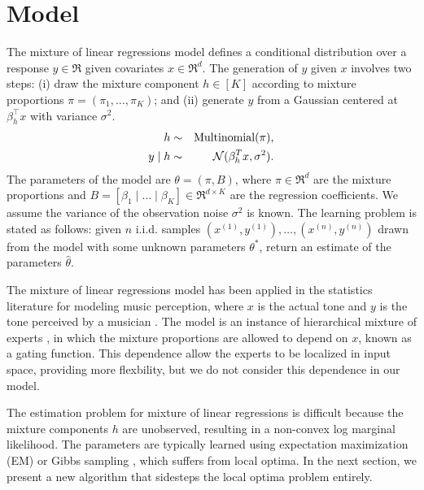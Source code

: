 \section{Model}
\label{sec:model}

\newcommand{\xn}[1]{x^{(#1)}}
\newcommand{\xni}{\xn{i}}
\newcommand{\yn}[1]{y^{(#1)}}
\newcommand{\yni}{\yn{i}}

The mixture of linear regressions model \citep{VieleTong2002} defines
a conditional distribution over a response $y \in \Re$
given covariates $x \in \Re^d$.
The generation of $y$ given $x$ involves two steps:
(i) draw the mixture component $h \in [K]$ according to mixture proportions
$\pi = (\pi_1, \dots, \pi_K)$;
and (ii) generate $y$ from a Gaussian centered at $\beta_h^\top x$ with
variance $\sigma^2$.
\begin{eqnarray*}
  h &\sim& \operatorname{Multinomial}(\pi), \\
  y \mid h &\sim& \mathcal{N}( \beta_{h}^T x,  \sigma^2 ).
\end{eqnarray*}
The parameters of the model are $\theta = (\pi, B)$,
where $\pi \in \Re^d$ are the mixture proportions and
$B = [\beta_1 \mid \dots \mid \beta_K] \in \Re^{d \times K}$
are the regression coefficients.
We assume the variance of the observation noise $\sigma^2$ is known.
The learning problem is stated as follows:
given $n$ i.i.d. samples $(\xn{1}, \yn{1}), \dots, (\xn{n}, \yn{n})$
drawn from the model with some unknown parameters $\theta^*$,
return an estimate of the parameters $\hat\theta$.

The mixture of linear regressions model has been applied
in the statistics literature for modeling music perception, where $x$ is the
actual tone and $y$ is the tone perceived by a musician \cite{VieleTong2002}.
The model is an instance of hierarchical mixture of experts
\cite{jacobs91experts}, in which the mixture proportions are allowed to depend
on $x$, known as a gating function.
This dependence allow the experts to be localized in input space,
providing more flexbility, but we do not consider this dependence in our model.

The estimation problem for mixture of linear regressions is difficult because
the mixture components $h$ are unobserved,
resulting in a non-convex log marginal likelihood.
The parameters are typically learned using
expectation maximization (EM) or Gibbs sampling \cite{VieleTong2002},
which suffers from local optima.
In the next section, we present a new algorithm
that sidesteps the local optima problem entirely.
